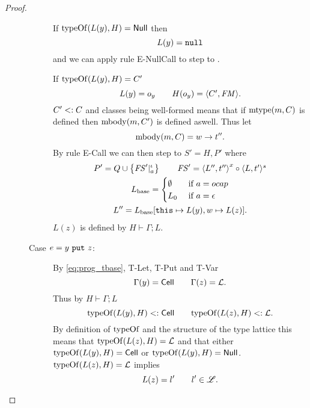 \begin{proof}
\begin{description}
\begin{description}
          If $\mbox{$\mathrm{typeOf}$}(L(y), H) = \mbox{$\mathsf{Null}$}$ then
          \begin{equation*}
            L(y) = \mbox{\mdseries\texttt{null}}
          \end{equation*}
          and we can apply rule {\sc E-NullCall} to step to \Error.
          \contradiction

          If $\mbox{$\mathrm{typeOf}$}(L(y), H) = C'$
          \begin{equation*}
            L(y) = o_y \quad\quad H(o_y) = \mbox{$\langle C', \mathit{FM} \rangle$}.
          \end{equation*}
          $C' <: C$ and classes being well-formed means that if $\mbox{$\mathrm{mtype}$}(m, C)$
          is defined then $\mbox{$\mathrm{mbody}$}(m, C')$ is defined aswell. Thus let
          \begin{equation*}
            \mbox{$\mathrm{mbody}$}(m, C) = w \to t''.
          \end{equation*}
          By rule {\sc E-Call} we can then step to $S' = H, P'$ where
          \begin{equation*}
            \begin{gathered}
              P' = Q \cup \left\{\mathit{FS}'|_a^\iota \right\} \quad\quad \mathit{FS}' = \mbox{$\langle L'',
              t'' \rangle$}^x \circ \mbox{$\langle L, t' \rangle^s$} \\
              L_{\text{base}} =
              \begin{cases}
                \emptyset & \text{ if } a = \mbox{$ocap$} \\
                L_0       & \text{ if } a = \mbox{$\epsilon$}
              \end{cases} \\
              L'' = L_{\text{base}}[\mbox{\mdseries\texttt{this}} \mapsto L(y), w \mapsto L(z)].
            \end{gathered}
          \end{equation*}
          $L(z)$ is defined by $H \vdash \Gamma; L$. \contradiction

        \item[Case $e = \mbox{\mdseries$y$~\texttt{put}~$z$}$:]
          By \eqref{eq:prog_tbase}, {\sc T-Let}, {\sc T-Put} and {\sc T-Var}
          \begin{equation*}
            \Gamma(y) = \mbox{$\mathsf{Cell}$} \quad\quad \Gamma(z) = \mbox{$\mathcal{L}$}.
          \end{equation*}
          Thus by $H \vdash \Gamma; L$
          \begin{equation*}
            \mbox{$\mathrm{typeOf}$}(L(y), H) <: \mbox{$\mathsf{Cell}$} \quad\quad \mbox{$\mathrm{typeOf}$}(L(z), H) <:
            \mbox{$\mathcal{L}$}.
          \end{equation*}
          By definition of $\mbox{$\mathrm{typeOf}$}$ and the structure of the type lattice this
          means that $\mbox{$\mathrm{typeOf}$}(L(z), H) = \mbox{$\mathcal{L}$}$ and that either
          $\mbox{$\mathrm{typeOf}$}(L(y), H) = \mbox{$\mathsf{Cell}$}$ or $\mbox{$\mathrm{typeOf}$}(L(y), H) = \mbox{$\mathsf{Null}$}$. \\
          $\mbox{$\mathrm{typeOf}$}(L(z), H) = \mbox{$\mathcal{L}$}$ implies
          \begin{equation*}
            L(z) = l' \quad\quad l' \in \mbox{$\mathscr{L}$}.
          \end{equation*}


\end{description}
\end{description}
\end{proof}
